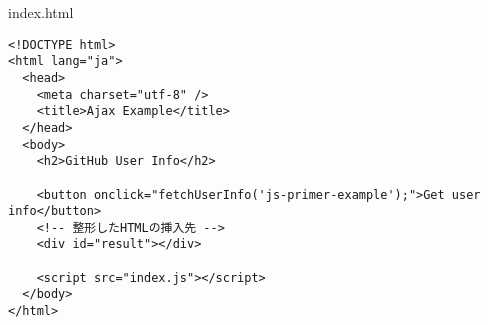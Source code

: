 \begin{listtitle}
index.html
\end{listtitle}
\begin{lstlisting}
<!DOCTYPE html>
<html lang="ja">
  <head>
    <meta charset="utf-8" />
    <title>Ajax Example</title>
  </head>
  <body>
    <h2>GitHub User Info</h2>

    <button onclick="fetchUserInfo('js-primer-example');">Get user info</button>
    <!-- 整形したHTMLの挿入先 -->
    <div id="result"></div>

    <script src="index.js"></script>
  </body>
</html>
\end{lstlisting}
\listend
